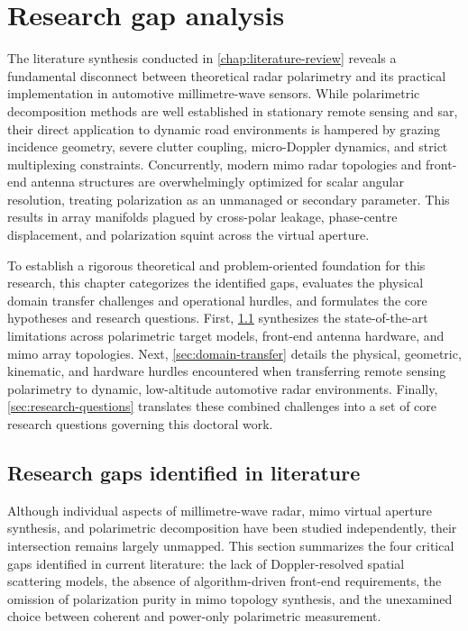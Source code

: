 \chapter{Research gap analysis}
\label{chap:research-gap-analysis}

The literature synthesis conducted in \cref{chap:literature-review} reveals a fundamental disconnect between theoretical radar polarimetry and its practical implementation in automotive millimetre-wave sensors.
While polarimetric decomposition methods are well established in stationary remote sensing and \gls{sar}, their direct application to dynamic road environments is hampered by grazing incidence geometry, severe clutter coupling, micro-Doppler dynamics, and strict multiplexing constraints.
Concurrently, modern \gls{mimo} radar topologies and front-end antenna structures are overwhelmingly optimized for scalar angular resolution, treating polarization as an unmanaged or secondary parameter.
This results in array manifolds plagued by cross-polar leakage, phase-centre displacement, and polarization squint across the virtual aperture.

To establish a rigorous theoretical and problem-oriented foundation for this research, this chapter categorizes the identified gaps, evaluates the physical domain transfer challenges and operational hurdles, and formulates the core hypotheses and research questions.
First, \cref{sec:gaps-identified} synthesizes the state-of-the-art limitations across polarimetric target models, front-end antenna hardware, and \gls{mimo} array topologies.
Next, \cref{sec:domain-transfer} details the physical, geometric, kinematic, and hardware hurdles encountered when transferring remote sensing polarimetry to dynamic, low-altitude automotive radar environments.
Finally, \cref{sec:research-questions} translates these combined challenges into a set of core research questions governing this doctoral work.


\section{Research gaps identified in literature}
\label{sec:gaps-identified}

Although individual aspects of millimetre-wave radar, \gls{mimo} virtual aperture synthesis, and polarimetric decomposition have been studied independently, their intersection remains largely unmapped.
This section summarizes the four critical gaps identified in current literature: the lack of Doppler-resolved spatial scattering models, the absence of algorithm-driven front-end requirements, the omission of polarization purity in \gls{mimo} topology synthesis, and the unexamined choice between coherent and power-only polarimetric measurement.


